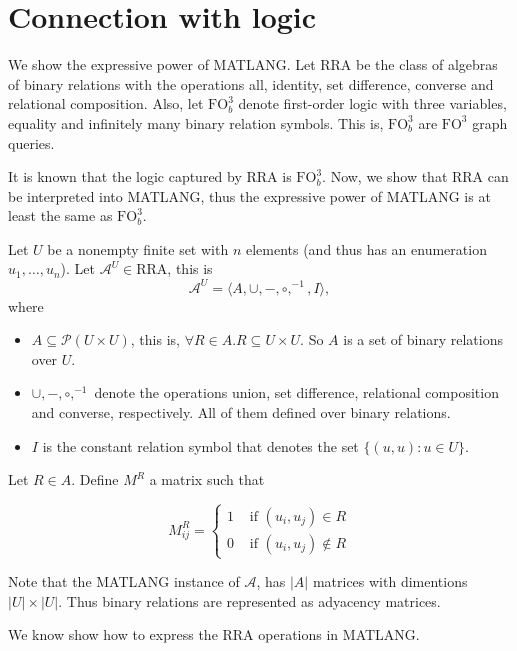\section{Connection with logic}

We show the expressive power of MATLANG. Let RRA be the class of algebras of binary relations with the operations all, identity, set difference, converse and relational composition. Also, let $\text{FO}^3_b$ denote first-order logic with three variables, equality and infinitely many binary relation symbols. This is, $\text{FO}^3_b$ are $\text{FO}^3$ graph queries.

It is known that the logic captured by RRA is $\text{FO}^3_b$. Now, we show that RRA can be interpreted into MATLANG, thus the expressive power of MATLANG is at least the same as $\text{FO}^3_b$.

Let $U$ be a nonempty finite set with $n$ elements (and thus has an enumeration $u_1,\ldots, u_n$). Let $\mathcal{A}^U\in\text{RRA}$, this is $$\mathcal{A}^U=\langle A, \cup, -, \circ, ^{-1}, I\rangle,$$ where 

\begin{itemize}
	\item $A\subseteq\mathcal{P}(U\times U)$, this is, $\forall R\in A. R\subseteq U\times U$. So $A$ is a set of binary relations over $U$.
	\item $\cup, -, \circ, ^{-1}$ denote the operations union, set difference, relational composition and converse, respectively. All of them defined over binary relations.
	\item $I$ is the constant relation symbol that denotes the set $\lbrace (u,u):u\in U\rbrace$.
\end{itemize}

Let $R\in A$. Define $M^R$ a matrix such that

\[ M^R_{ij}=
    \begin{cases} 
      1 & \text{ if }(u_i, u_j)\in R \\
      0 & \text{ if }(u_i, u_j)\notin R 
   \end{cases}
\]

Note that the MATLANG instance of $\mathcal{A}$, has $|A|$ matrices with dimentions $|U|\times |U|$. Thus binary relations are represented as adyacency matrices.

We know show how to express the RRA operations in MATLANG.

